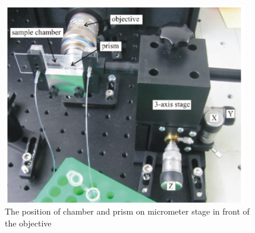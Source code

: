 \documentclass[a4paper,english,12pt,bibliography=totoc]{scrreprt}
\begin{document}
\begin{figure}
    \centering
    \includegraphics[width = 0.95\textwidth]{images/Bulit in chamber with prism on micrometer stage in front of the objective.png}
    \caption{The position of chamber and prism on micrometer stage in front of the objective}
\end{figure}
\end{document}
